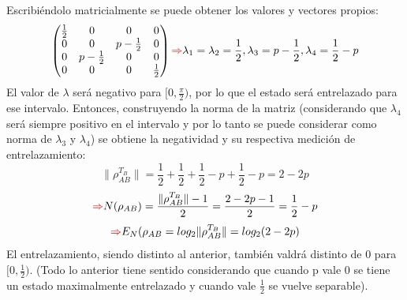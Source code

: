 \documentclass{book}
\begin{document}
Escribiéndolo matricialmente se puede obtener los valores y vectores propios:
$$ \begin{pmatrix} \frac{1}{2}&0&0&0\\0&0&p-\frac{1}{2}&0\\0&p-\frac{1}{2}&0&0\\0&0&0&\frac{1}{2}\end{pmatrix}\textcolor{red}{\Rightarrow} \lambda_1=\lambda_2=\frac{1}{2}, \lambda_3=p-\frac{1}{2}, \lambda_4=\frac{1}{2}-p$$
El valor de $\lambda$ será negativo para $[0,\frac{\pi}{2})$, por lo que el estado será entrelazado para ese intervalo. Entonces, construyendo la norma de la matriz (considerando que $\lambda_4$ será siempre positivo en el intervalo y por lo tanto se puede considerar como norma de $\lambda_3$ y $\lambda_4$) se obtiene la negatividad y su respectiva medición de entrelazamiento:
$$\lVert\rho_{AB}^{T_B}\lVert=\frac{1}{2}+\frac{1}{2}+\frac{1}{2}-p+\frac{1}{2}-p=2-2p$$
$$\textcolor{red}{\Rightarrow} N(\rho_{AB})=\frac{\lVert\rho_{AB}^{T_B}\rVert-1}{2}=\frac{2-2p-1}{2}=\frac{1}{2}-p$$ 
$$\textcolor{red}{\Rightarrow} E_N(\rho_{AB}=log_2\lVert\rho_{AB}^{T_B}\rVert=log_2(2-2p)$$
El entrelazamiento, siendo distinto al anterior, también valdrá distinto de 0 para $[0,\frac{1}{2})$. (Todo lo anterior tiene sentido considerando que cuando p vale 0 se tiene un estado maximalmente entrelazado y cuando vale $\frac{1}{2}$ se vuelve separable).
\end{document}

